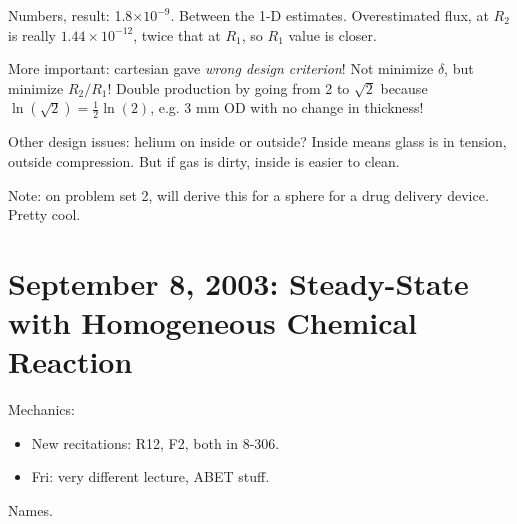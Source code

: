 \documentclass{report}
\begin{document}
\noindent Numbers, result: 1.8$\times10^{-9}$.  Between the 1-D estimates.
Overestimated flux, at $R_2$ is really $1.44\times10^{-12}$, twice that at
$R_1$, so $R_1$ value is closer.

\noindent More important: cartesian gave {\em wrong design criterion}!  Not
minimize $\delta$, but minimize $R_2/R_1$!  Double production by going from 2
to $\sqrt{2}$ because $\ln(\sqrt{2}) = \frac{1}{2}\ln(2)$, e.g. 3 mm OD with no
change in thickness!

\noindent Other design issues: helium on inside or outside?  Inside means glass
is in tension, outside compression.  But if gas is dirty, inside is easier to
clean.

\noindent Note: on problem set 2, will derive this for a sphere for a drug
delivery device.  Pretty cool.
\newpage


\section{September 8, 2003: Steady-State with Homogeneous Chemical Reaction}

\noindent Mechanics:
\begin{itemize}
\item New recitations: R12, F2, both in 8-306.
\item Fri: very different lecture, ABET stuff.
\end{itemize}
Names.
\end{document}
